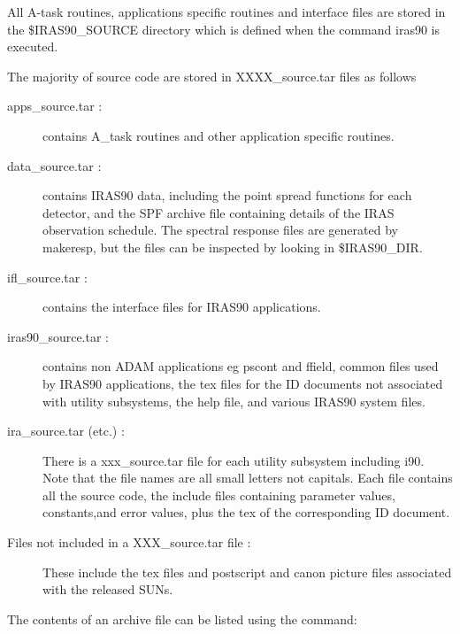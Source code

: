 \documentclass[twoside,11pt,nolof]{starlink}
\begin{document}
All A-task routines, applications specific routines and interface files are
stored in the
\newline
\$IRAS90\_SOURCE directory which is defined when the command iras90 is executed.

The majority of source code are stored in XXXX\_source.tar files as follows

\begin{description}

\item [apps\_source.tar :] contains A\_task routines and other application
specific routines.

\item [data\_source.tar :] contains IRAS90 data, including the point spread
functions for each detector, and the SPF archive file containing details of
the {\small IRAS} observation schedule. The spectral response files are
generated by makeresp, but the files can be inspected by looking in
\$IRAS90\_DIR.

\item [ifl\_source.tar :] contains the interface files for {\small IRAS90}
applications.

\item [iras90\_source.tar :] contains non {\small ADAM} applications eg pscont
and ffield, common files used by {\small IRAS90} applications, the tex files
for the {\small ID} documents not associated with utility subsystems, the help
file, and various {\small IRAS90} system files.

\item [ira\_source.tar (etc.) :] There is a xxx\_source.tar file for each
utility subsystem including {\small i90}. Note that the file names are all
small letters not capitals. Each file contains all the source code, the
include files containing parameter values, constants,and error values, plus the
tex of the corresponding {\small ID} document.

\item [Files not included in a XXX\_source.tar file :] These include the
tex files and postscript and canon picture files associated with the released
SUNs.

\end{description}

The contents of an archive file can be listed using the command:

\small
\begin{terminalv}
\end{terminalv}
\normalsize
\end{document}
